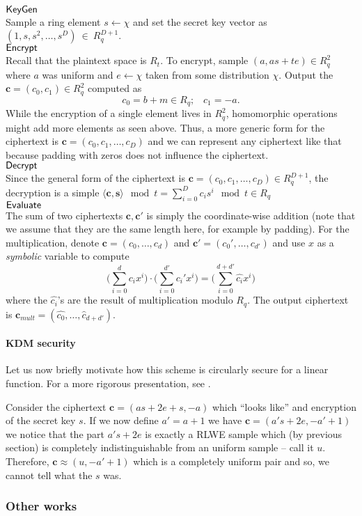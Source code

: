 \begin{table}
\begin{mdframed}
	$\textsf{KeyGen}$\\
	Sample a ring element $s \leftarrow \chi$ and set the secret key vector as $(1, s, s^2, \ldots, s^D)~\in~R_q^{D+1}$. \\
	$\textsf{Encrypt}$\\
	Recall that the plaintext space is $R_t$. To encrypt, sample $(a, as +te) \in R_q^2$ where $a$ was uniform and $e \leftarrow \chi$ taken from some distribution $\chi$. Output the $\bm{c} = (c_0, c_1) \in R_q^2$ computed as
	\[c_0 = b +m \in R_q; \; \; \; c_1 = -a.  \]
	While the encryption of a single element lives in $R_q^2$, homomorphic operations might add more elements as seen above. Thus, a more generic form for the ciphertext is $\bm{c} = (c_0, c_1, \ldots, c_D)$ and we can represent any ciphertext like that because padding with zeros does not influence the ciphertext.
	\\
	$\textsf{Decrypt}$\\
	Since the general form of the ciphertext is $\bm{c} = (c_0, c_1, \ldots, c_D) \in R_q^{D+1}$, the decryption is a simple $\langle \bm{c, s} \rangle \mod t = \sum_{i = 0}^D c_i s^i \mod t \in R_q$ \\
	$\textsf{Evaluate}$\\
	The sum of two ciphertexts $\bm{c, c'}$ is simply the coordinate-wise addition (note that we assume that they are the same length here, for example by padding). For the multiplication, denote $\bm{c} = (c_0, \ldots, c_d)$ and $\bm{c'} = (c_0', \ldots, c_{d'})$ and use $x$ as a \textit{symbolic} variable to compute
	\[ \bigg( \sum_{i = 0}^d c_ix^i \bigg) \cdot \bigg(\sum_{i = 0}^{d'} c_i'x^i \bigg) =
	\bigg( \sum_{i = 0}^{d+d'} \hat{c_i}x^i \bigg) \]
	where the $\hat{c_i}$'s are the result of multiplication modulo $R_q$. The output ciphertext is $\bm{c}_{mult} = (\hat{c_0}, \ldots, \hat{c}_{d+d'})$.

\end{mdframed}
\end{table}

\paragraph{KDM security}
Let us now briefly motivate how this scheme is circularly secure for a linear function. For a more rigorous presentation, see \cite{fhe_rlwe}.

Consider the ciphertext $\bm{c}= (as +2e +s, -a)$ which ``looks like'' and encryption of the secret key $s$. If we now define $a' = a +1$ we have $\bm{c} = (a's +2e, -a'+1)$ we notice that the part $a's+2e$ is exactly a RLWE sample which (by previous section) is completely indistinguishable from an uniform sample -- call it $u$. Therefore, $\bm{c} \approx (u, -a'+1)$ which is a completely uniform pair and so, we cannot tell what the $s$ was.

\subsubsection{Other works}

